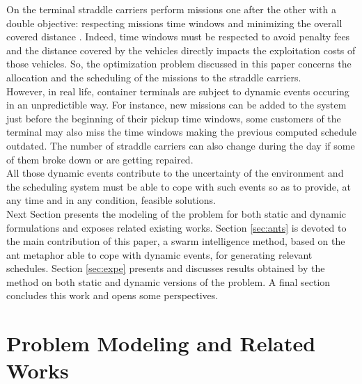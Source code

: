 \documentclass[a4paper,12pt]{article}
\begin{document}
On the terminal straddle carriers perform missions one after the other with a double objective: respecting missions time windows and minimizing the overall covered distance \cite{Lesauvage2009}. Indeed, time windows must be respected to avoid penalty fees and the distance covered by the vehicles directly impacts the exploitation costs of those vehicles. %
So, the optimization problem discussed in this paper concerns the allocation and the scheduling of the missions to the straddle carriers.\\

However, in real life, container terminals are subject to dynamic events occuring in an unpredictible way. For instance, new missions can be added to the system just before the beginning of their pickup time windows, some customers of the terminal may also miss the time windows making the previous computed schedule outdated. The number of straddle carriers can also change during the day if some of them broke down or are getting repaired.\\

All those dynamic events contribute to the uncertainty of the environment and the scheduling system must be able to cope with such events so as to provide, at any time and in any condition, feasible solutions.\\


Next Section presents the modeling of the problem for both static and dynamic formulations and exposes related existing works. Section \ref{sec:ants} is devoted to the main contribution of this paper, a swarm intelligence method, based on the ant metaphor able to cope with dynamic events, for generating relevant schedules. Section \ref{sec:expe} presents and discusses results obtained by the method on both static and dynamic versions of the problem. A final section concludes this work and opens some perspectives.


\section{Problem Modeling and Related Works}
\end{document}
